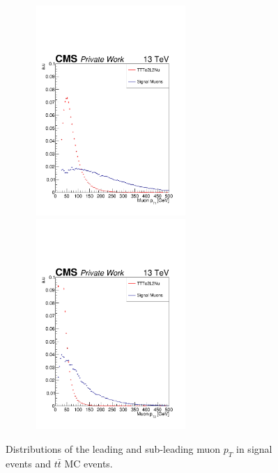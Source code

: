 \documentclass{cernatlasnote}
\begin{document}
\begin{figure}[ht]
\centering
\includegraphics[height=8cm, width=8cm, trim= 0cm 0cm 0cm 0.cm,clip]{images/Muon/MuonLeadingPt.pdf}\includegraphics[height=8cm, width=8cm, trim= 0cm 0cm 0cm 0.cm,clip]{images/Muon/MuonLeadingPt2.pdf}
\caption{\label{fig:MuonPt} Distributions of the leading and sub-leading muon $p_T$ in signal events and $t\bar{t}$ MC events.}
\end{figure}
\FloatBarrier
\end{document}
